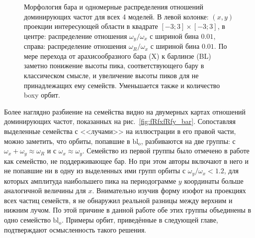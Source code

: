 \documentclass[tikz]{trlnotes}
\begin{document}
\begin{figure}[htpb]
\centering
{}  
\caption{Морфология бара и одномерные распределения отношений доминирующих частот для всех 4 моделей. В левой колонке:
  $(x,y)$ проекции интересующей области в квадрате $[-3;3]\times[-3;3]$, в центре: распределение отношения $ω_y/ω_x$ с шириной бина $0.01$, справа: распределение отношения $ω_R/ω_x$ с шириной бина $0.01$. По мере перехода от арахисообразного бара (X) к барлинзе (BL) заметно понижение высоты пика, соответствующего бару в классическом
  смысле, и увеличение высоты пиков для не принадлежащих ему семейств. Уменьшается также и количество boxy орбит.}
\label{fig:modelcomp1dist}
\end{figure}

Более наглядно разбиение на семейства видно на двумерных картах отношений
доминирующих частот, показанных на рис.~\ref{fig:fRfxfRfy_bar}.
Сопоставляя выделенные семейства с <<лучами>> на иллюстрации в его правой
части, можно заметить, что орбиты, попавшие в $\text{bl}_{\text{o}}$,
разбиваются на две группы: с $ω_x + ω_y \approx ω_R$ и с $ω_x \approx
ω_y$. Семейство из первой группы было отмечено в работе \citet{gajda2016}
как семейство, не поддерживающее бар. Но при этом авторы включают в него
и не попавшие ни в одну из выделенных ими групп орбиты с $ω_y/ω_x < 1.2$,
для которых амплитуда наибольшего пика на периодограмме $y$ координаты
больше аналогичной величины для $x$. Внимательно изучив форму изофот на
проекциях всех частиц семейств, я не обнаружил реальной разницы между
верхним и нижним лучом. По этой причине в данной работе обе этих группы
объединены в одно семейство  $\text{bl}_\text{o}$. Примеры орбит,
приведённые в следующей главе, подтверждают осмысленность такого решения.
\end{document}
